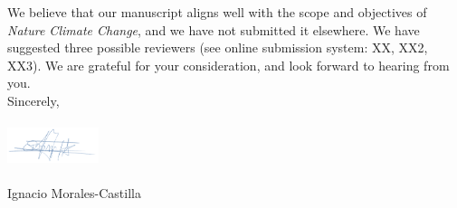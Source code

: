 \documentclass[11pt,a4paper]{letter}
\begin{document}
\begin{letter}{}
We believe that our manuscript aligns well with the scope and objectives of \emph{Nature Climate Change}, and we have not submitted it elsewhere. We have suggested three possible reviewers (see online submission system: XX, XX2, XX3). We are grateful for your consideration, and look forward to hearing from you.
\vspace{1.5ex}\\
\noindent Sincerely,\\
\vspace{1.5ex}\\
 \includegraphics[width=0.2\textwidth]{Signature_IMC.png} \\
 \vspace{1.5ex}\\
\noindent Ignacio Morales-Castilla


\end{letter}
\end{document}
